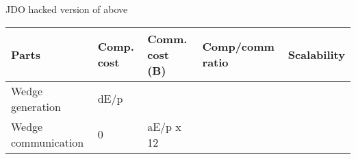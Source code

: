 \documentclass[10pt,oneside]{memoir}
\begin{document}
JDO hacked version of above

\begin{longtable}[]{@{}lllll@{}}
\toprule
\begin{minipage}[b]{0.23\columnwidth}\raggedright
Parts\strut
\end{minipage} & \begin{minipage}[b]{0.12\columnwidth}\raggedright
Comp. cost\strut
\end{minipage} & \begin{minipage}[b]{0.15\columnwidth}\raggedright
Comm. cost (B)\strut
\end{minipage} & \begin{minipage}[b]{0.22\columnwidth}\raggedright
Comp/comm ratio\strut
\end{minipage} & \begin{minipage}[b]{0.13\columnwidth}\raggedright
Scalability\strut
\end{minipage}\tabularnewline
\midrule
\endhead
\begin{minipage}[t]{0.23\columnwidth}\raggedright
Wedge generation\strut
\end{minipage} & \begin{minipage}[t]{0.12\columnwidth}\raggedright
dE/p\strut
\end{minipage} & \begin{minipage}[t]{0.15\columnwidth}\raggedright
\strut
\end{minipage} & \begin{minipage}[t]{0.22\columnwidth}\raggedright
\strut
\end{minipage} & \begin{minipage}[t]{0.13\columnwidth}\raggedright
\strut
\end{minipage}\tabularnewline
\begin{minipage}[t]{0.23\columnwidth}\raggedright
Wedge communication\strut
\end{minipage} & \begin{minipage}[t]{0.12\columnwidth}\raggedright
0\strut
\end{minipage} & \begin{minipage}[t]{0.15\columnwidth}\raggedright
aE/p x 12\strut
\end{minipage} & \begin{minipage}[t]{0.22\columnwidth}\raggedright
\strut
\end{minipage} & \begin{minipage}[t]{0.13\columnwidth}\raggedright
\strut
\end{minipage}\tabularnewline

\end{longtable}
\end{document}
